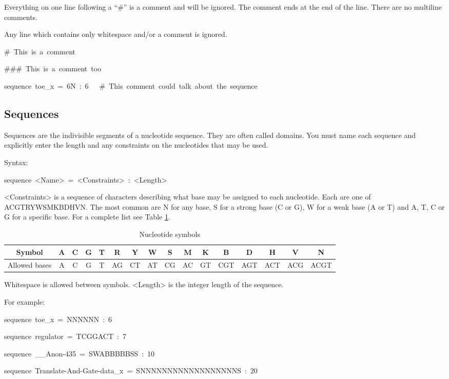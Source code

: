 \documentclass{article}
\newenvironment{code}
{\par\begin{list}{}{
\setlength{\rightmargin}{\leftmargin}
\setlength{\listparindent}{0pt}
\raggedright
\setlength{\itemsep}{0pt}
\setlength{\parsep}{0pt}
\normalfont\ttfamily}
 \item[]}
{\end{list}}
\begin{document}
Everything on one line following a {}``\#'' is a comment and will
be ignored. The comment ends at the end of the line. There are no
multiline comments.

Any line which contains only whitespace and/or a comment is ignored.
\begin{code}
\#~This~is~a~comment

\#\#\#~This~is~a~comment~too

sequence~toe\_x~=~6N~:~6~~~\#~This~comment~could~talk~about~the~sequence~
\end{code}

\subsection{Sequences}

Sequences are the indivisible segments of a nucleotide sequence. They
are often called domains. You must name each sequence and explicitly
enter the length and any constraints on the nucleotides that may be
used.

Syntax:
\begin{code}
sequence~<Name>~=~<Constraints>~:~<Length>
\end{code}
<Constraints> is a sequence of characters describing what base may
be assigned to each nucleotide. Each are one of ACGTRYWSMKBDHVN. The
most common are N for any base, S for a strong base (C or G), W for
a weak base (A or T) and A, T, C or G for a specific base. For a complete
list see Table \ref{tab:Nucleotide-symbols}.%
\begin{table}[b]
\noindent \begin{centering}
\begin{tabular}{|c|c|c|c|c|c|c|c|c|c|c|c|c|c|c|c|}
\hline 
Symbol & A & C & G & T & R & Y & W & S & M & K & B & D & H & V & N\\
\hline 
Allowed bases & A & C & G & T & AG & CT & AT & CG & AC & GT & CGT & AGT & ACT & ACG & ACGT\\
\hline
\end{tabular}
\par\end{centering}

\caption{\label{tab:Nucleotide-symbols}Nucleotide symbols}



\end{table}
 Whitespace is allowed between symbols. <Length> is the integer length
of the sequence.

For example:
\begin{code}
sequence~toe\_x~=~NNNNNN~:~6

sequence~regulator~=~TCGGACT~:~7

sequence~\_\_Anon-435~=~SWABBBBBSS~:~10

sequence~Translate-And-Gate-data\_x~=~SNNNNNNNNNNNNNNNNNNS~:~20
\end{code}
\end{document}
